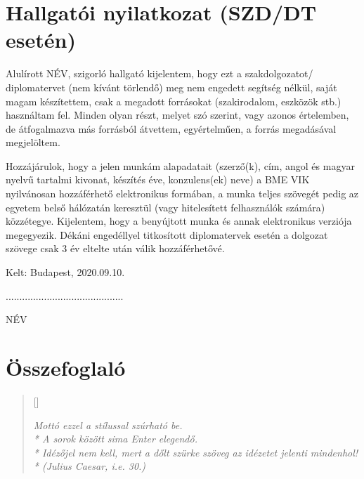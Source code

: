 \documentclass[a4paper, 12pt]{article}
\begin{document}
\newpage

\section*{Hallgatói nyilatkozat (SZD/DT esetén)}
Alulírott NÉV, szigorló hallgató kijelentem, hogy ezt a szakdolgozatot/ diplomatervet (nem kívánt törlendő) meg nem engedett segítség nélkül, saját magam készítettem, csak a megadott forrásokat (szakirodalom, eszközök stb.) használtam fel. 
Minden olyan részt, melyet szó szerint, vagy azonos értelemben, de átfogalmazva más forrásból átvettem, egyértelműen, a forrás megadásával megjelöltem. \par
Hozzájárulok, hogy a jelen munkám alapadatait (szerző(k), cím, angol és magyar nyelvű tartalmi kivonat, készítés éve, konzulens(ek) neve) a BME VIK nyilvánosan hozzáférhető elektronikus formában, a munka teljes szövegét pedig az egyetem belső hálózatán keresztül (vagy hitelesített felhasználók számára) közzétegye. 
Kijelentem, hogy a benyújtott munka és annak elektronikus verziója megegyezik. Dékáni engedéllyel titkosított diplomatervek esetén a dolgozat szövege csak 3 év eltelte után válik hozzáférhetővé. \par
Kelt: Budapest, 2020.09.10. \par
\begin{flushright}
	...........................................\par
	NÉV $\qquad \qquad$ %
\end{flushright}
\newpage

\section*{Összefoglaló}

\settowidth{\versewidth}{Mottó ezzel a stílussal szúrható be.}
	\begin{verse}[\versewidth]
		\begin{flushright}
			\textit{
			Mottó ezzel a stílussal szúrható be.\\*
			A sorok között sima Enter elegendő.\\*
			Idézőjel nem kell, mert a dőlt szürke szöveg az idézetet jelenti mindenhol!\\*
			(Julius Caesar, i.e. 30.)
			}
		\end{flushright}
	\end{verse}
	
\end{document}
